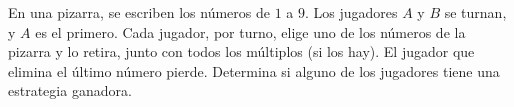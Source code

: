 En una pizarra, se escriben los números de $1$ a $9$. Los jugadores $A$ y $B$ se turnan, y $A$ es el primero. Cada jugador, por turno, elige uno de los números de la pizarra y lo retira, junto con todos los múltiplos (si los hay). El jugador que elimina el último número pierde.
Determina si alguno de los jugadores tiene una estrategia ganadora.
